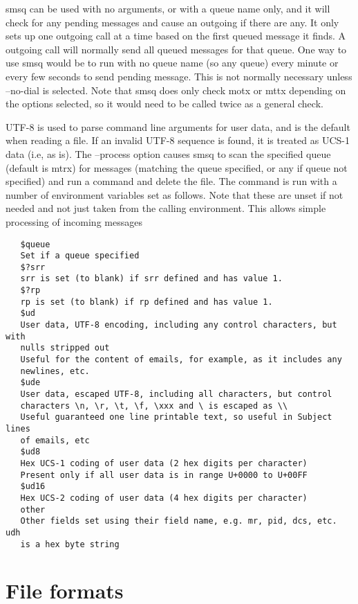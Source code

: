    smsq can be used with no arguments, or with a queue name only, and it
   will check for any pending messages and cause an outgoing if there are
   any. It only sets up one outgoing call at a time based on the first
   queued message it finds. A outgoing call will normally send all queued
   messages for that queue. One way to use smsq would be to run with no
   queue name (so any queue) every minute or every few seconds to send
   pending message. This is not normally necessary unless --no-dial is
   selected. Note that smsq does only check motx or mttx depending on the
   options selected, so it would need to be called twice as a general
   check.

   UTF-8 is used to parse command line arguments for user data, and is
   the default when reading a file. If an invalid UTF-8 sequence is
   found, it is treated as UCS-1 data (i.e, as is).
   The --process option causes smsq to scan the specified queue (default
   is mtrx) for messages (matching the queue specified, or any if queue
   not specified) and run a command and delete the file. The command is
   run with a number of environment variables set as follows. Note that
   these are unset if not needed and not just taken from the calling
   environment. This allows simple processing of incoming messages
\begin{verbatim}
   $queue
   Set if a queue specified
   $?srr
   srr is set (to blank) if srr defined and has value 1.
   $?rp
   rp is set (to blank) if rp defined and has value 1.
   $ud
   User data, UTF-8 encoding, including any control characters, but with
   nulls stripped out
   Useful for the content of emails, for example, as it includes any
   newlines, etc.
   $ude
   User data, escaped UTF-8, including all characters, but control
   characters \n, \r, \t, \f, \xxx and \ is escaped as \\
   Useful guaranteed one line printable text, so useful in Subject lines
   of emails, etc
   $ud8
   Hex UCS-1 coding of user data (2 hex digits per character)
   Present only if all user data is in range U+0000 to U+00FF
   $ud16
   Hex UCS-2 coding of user data (4 hex digits per character)
   other
   Other fields set using their field name, e.g. mr, pid, dcs, etc. udh
   is a hex byte string
\end{verbatim}

\section{File formats}

